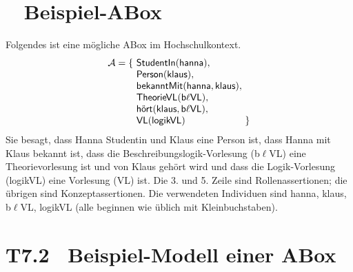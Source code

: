 \documentclass[fontsize=11pt, twoside=false, numbers=autoenddot]{scrbook}
\begin{document}
\section*{\hypertarget{BspABox}{\BspABox}~ Beispiel-ABox}

Folgendes ist eine mögliche ABox im Hochschulkontext.
\[
\begin{array}{@{}r@{~}l@{~}l@{}}
  \Amc = \{ & \textsf{StudentIn}(\textsf{hanna}), & \\
            & \textsf{Person}(\textsf{klaus}), & \\
            & \textsf{bekanntMit}(\textsf{hanna},\textsf{klaus}), & \\
            & \textsf{TheorieVL}(\textsf{b$\ell$VL}), & \\
            & \textsf{hört}(\textsf{klaus},\textsf{b$\ell$VL}), & \\
            & \textsf{VL}(\textsf{logikVL}) & \}
\end{array}
\]
Sie besagt, dass Hanna Studentin und Klaus eine Person ist,
dass Hanna mit Klaus bekannt ist, dass die Beschreibungslogik-Vorlesung
(\textsf{b$\ell$VL}) eine Theorievorlesung ist und von Klaus gehört wird
und dass die Logik-Vorlesung (\textsf{logikVL}) eine Vorlesung (\textsf{VL}) ist.
Die 3. und 5. Zeile sind Rollenassertionen; die übrigen sind Konzeptassertionen.
Die verwendeten Individuen sind \textsf{hanna}, \textsf{klaus},
\textsf{b$\ell$VL}, \textsf{logikVL} (alle beginnen wie üblich mit Kleinbuchstaben). 

\newcommand{\BspABoxModell}{T7.2}
\section*{\hypertarget{BspABoxModell}{\BspABoxModell}~ Beispiel-Modell einer ABox}
\newcommand{\mytab}[1]{\begin{tabular}{@{}c@{}}#1\end{tabular}}
\end{document}
